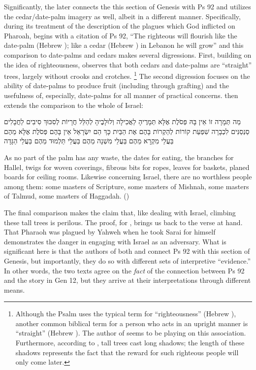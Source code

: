 Significantly, the later \GenRabbah connects the this section of Genesis with Ps 92 and utilizes the cedar/date-palm imagery as well, albeit in a different manner. Specifically, during its treatment of the description of the plagues which God inflicted on Pharoah, \GenRabbah begins with a citation of Ps 92, ``The righteous will flourish like the date-palm (Hebrew ); like a cedar (Hebrew ) in Lebanon he will grow'' and this comparison to date-palms and cedars makes several digressions. First, building on the idea of righteousness, \GenRabbah observes that both cedars and date-palms are ``straight'' trees, largely without crooks and crotches.%
    \footnote{Although the Psalm uses the typical term for ``righteousness'' (Hebrew ), another common biblical term for a person who acts in an upright manner is ``straight'' (Hebrew ). The author of \GenRabbah seems to be playing on this association. Furthermore, according to \GenRabbah, tall trees cast long shadows; the length of these shadows represents the fact that the reward for such righteous people will only come later.}
The second digression focuses on the ability of date-palms to produce fruit (including through grafting) and the usefulness of, especially, date-palms for all manner of practical concerns. \GenRabbah then extends the comparison to the whole of Israel:
\begin{aramaictext}
    מַה תְּמָרָה זוֹ אֵין בָּהּ פְּסֹלֶת אֶלָּא תְּמָרֶיהָ לַאֲכִילָה וְלוּלָבֶיהָ לְהַלֵּל חֲרָיוֹת לְסִכּוּךְ סִיבִים לַחֲבָלִים סַנְסַנִּים לִכְבָרָה שִׁפְעַת קוֹרוֹת לְהַקְרוֹת בָּהֶם אֶת הַבַּיִת כָּךְ הֵם יִשְׂרָאֵל אֵין בָּהֶם פְּסֹלֶת אֶלָּא מֵהֶם בַּעֲלֵי מִקְרָא מֵהֶם בַּעֲלֵי מִשְׁנָה מֵהֶם בַּעֲלֵי תַּלְמוּד מֵהֶם בַּעֲלֵי הַגָּדָה
\end{aramaictext}
\begin{translation}
    As no part of the palm has any waste, the dates for eating, the branches for Hallel, twigs for woven coverings, fibrous bits for ropes, leaves for baskets, planed boards for ceiling rooms. Likewise concerning Israel, there are no worthless people among them: some masters of Scripture, some masters of Mishnah, some masters of Talmud, some masters of Haggadah. ()
\end{translation}
\noindent
The final comparison makes the claim that, like dealing with Israel, climbing these tall trees is perilous. The proof, for \GenRabbah, brings us back to the verse at hand. That Pharaoh was plagued by Yahweh when he took Sarai for himself demonstrates the danger in engaging with Israel as an adversary. What is significant here is that the authors of both \ga and \GenRabbah connect Ps 92 with this section of Genesis, but importantly, they do so with different sets of interpretive ``evidence.'' In other words, the two texts agree on the \emph{fact} of the connection between Ps 92 and the story in Gen 12, but they arrive at their interpretations through different means.%
